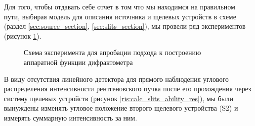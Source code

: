 Для того, чтобы отдавать себе отчет в том что мы находимся на правильном пути, выбирая
модель для описания источника и щелевых устройств в схеме (раздел \ref{sec:source_section}, \ref{sec:slits_section}),
мы провели ряд экспериментов (рисунок \ref{ris:for_slits_scan}).

\begin{figure}[H]
  \centering
  \hfill
  \caption{Схема эксперимента для апробации подхода к построению аппаратной функции дифрактометра}
  \label{ris:for_slits_scan}

\end{figure}
В виду отсутствия линейного детектора для прямого наблюдения углового распределения интенсивности рентгеновского
пучка после его прохождения через систему щелевых устройств (рисунок \ref{ris:calc_slits_ability_res}),
мы были вынуждены изменять угловое положение второго щелевого устройства (S2) и измерять суммарную интенсивность
за ним.


